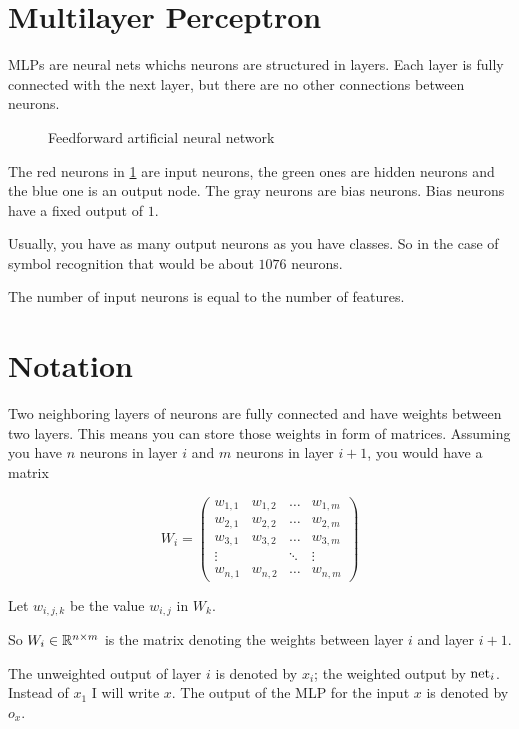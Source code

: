 \section{Multilayer Perceptron}\label{ch:Content2:sec:Section2}

\Glspl{MLP} are neural nets whichs neurons are structured in layers.
Each layer is fully connected with the next layer, but there are no other
connections between neurons.

\begin{figure}[ht]
    \centering
    
    \caption{Feedforward artificial neural network}
    \label{fig:feedforward}
\end{figure}

The red neurons in \cref{fig:feedforward} are input neurons, the green ones are
hidden neurons and the blue one is an output node. The gray neurons are bias neurons.
Bias neurons have a fixed output of $1$.

Usually, you have as many output neurons as you have classes. So in the case of
symbol recognition that would be about $\si{1076}$ neurons.

The number of input neurons is equal to the number of features.

\section{Notation}
Two neighboring layers of neurons are fully connected and have weights between
two layers. This means you can store those weights in form of matrices.
Assuming you have $n$ neurons in layer $i$ and $m$ neurons in layer $i + 1$,
you would have a matrix

\[W_i = \begin{pmatrix}
    w_{1,1} & w_{1,2} & \dots & w_{1,m}\\
    w_{2,1} & w_{2,2} & \dots & w_{2,m}\\
    w_{3,1} & w_{3,2} & \dots & w_{3,m}\\
    \vdots  &         & \ddots& \vdots \\
    w_{n,1} & w_{n,2} & \dots & w_{n,m}
\end{pmatrix}\]

Let $w_{i,j,k}$ be the value $w_{i,j}$ in $W_k$.

So $W_i \in \mathbb{R}^{n \times m}$ is the matrix denoting the weights between layer
$i$ and layer $i+1$.

The unweighted output of layer $i$ is denoted by $x_i$; the weighted output
by $\mathrm{net}_i$. Instead of $x_1$ I will write $x$.
The output of the \gls{MLP} for the input $x$ is denoted by $o_x$.

